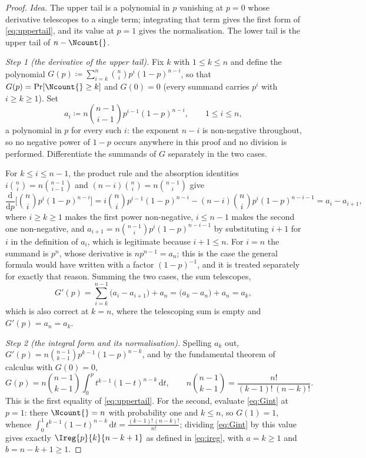 \begin{proof}
\emph{Idea.} The upper tail is a polynomial in $p$ vanishing at $p=0$ whose
derivative telescopes to a single term; integrating that term gives the first
form of \eqref{eq:uppertail}, and its value at $p=1$ gives the normalisation.
The lower tail is the upper tail of $n-\Ncount{}$.

\emph{Step 1 (the derivative of the upper tail).} Fix $k$ with $1\le k\le n$
and define the polynomial
$G(p)\coloneqq\sum_{i=k}^{n}\binom{n}{i}p^{i}(1-p)^{n-i}$, so that
$G(p)=\Pr[\Ncount{}\ge k]$ and $G(0)=0$ (every summand carries $p^{i}$ with
$i\ge k\ge1$). Set
\begin{equation*}
  a_i\coloneqq n\binom{n-1}{i-1}p^{i-1}(1-p)^{n-i},
  \qquad 1\le i\le n ,
\end{equation*}
a polynomial in $p$ for every such $i$: the exponent $n-i$ is non-negative
throughout, so no negative power of $1-p$ occurs anywhere in this proof and no
division is performed. Differentiate the summands of $G$ separately in the two
cases.

For $k\le i\le n-1$, the product rule and the absorption identities
$i\binom{n}{i}=n\binom{n-1}{i-1}$ and $(n-i)\binom{n}{i}=n\binom{n-1}{i}$ give
\begin{equation*}
  \frac{\mathrm{d}}{\mathrm{d}p}\Big[\binom{n}{i}p^{i}(1-p)^{n-i}\Big]
  =i\binom{n}{i}p^{i-1}(1-p)^{n-i}-(n-i)\binom{n}{i}p^{i}(1-p)^{n-i-1}
  =a_i-a_{i+1},
\end{equation*}
where $i\ge k\ge1$ makes the first power non-negative, $i\le n-1$ makes the
second one non-negative, and $a_{i+1}=n\binom{n-1}{i}p^{i}(1-p)^{n-i-1}$ by
substituting $i+1$ for $i$ in the definition of $a_i$, which is legitimate
because $i+1\le n$. For $i=n$ the summand is $p^{n}$, whose derivative is
$np^{n-1}=a_n$; this is the case the general formula would have written with a
factor $(1-p)^{-1}$, and it is treated separately for exactly that reason.
Summing the two cases, the sum telescopes,
\begin{equation*}
  G'(p)=\sum_{i=k}^{n-1}\big(a_i-a_{i+1}\big)+a_n
       =\big(a_k-a_n\big)+a_n
       =a_k ,
\end{equation*}
which is also correct at $k=n$, where the telescoping sum is empty and
$G'(p)=a_n=a_k$.

\emph{Step 2 (the integral form and its normalisation).} Spelling $a_k$ out,
$G'(p)=n\binom{n-1}{k-1}p^{k-1}(1-p)^{n-k}$, and by the fundamental
theorem of calculus with $G(0)=0$,
\begin{equation}\label{eq:Gint}
  G(p)=n\binom{n-1}{k-1}\int_0^{p}t^{k-1}(1-t)^{n-k}\,\mathrm{d}t,
  \qquad
  n\binom{n-1}{k-1}=\frac{n!}{(k-1)!\,(n-k)!}.
\end{equation}
This is the first equality of \eqref{eq:uppertail}. For the second, evaluate
\eqref{eq:Gint} at $p=1$: there $\Ncount{}=n$ with probability one and $k\le
n$, so $G(1)=1$, whence
$\int_0^{1}t^{k-1}(1-t)^{n-k}\,\mathrm{d}t=\frac{(k-1)!\,(n-k)!}{n!}$;
dividing \eqref{eq:Gint} by this value gives exactly
$\Ireg{p}{k}{n-k+1}$ as defined in \eqref{eq:ireg}, with $a=k\ge1$ and
$b=n-k+1\ge1$.


\end{proof}
